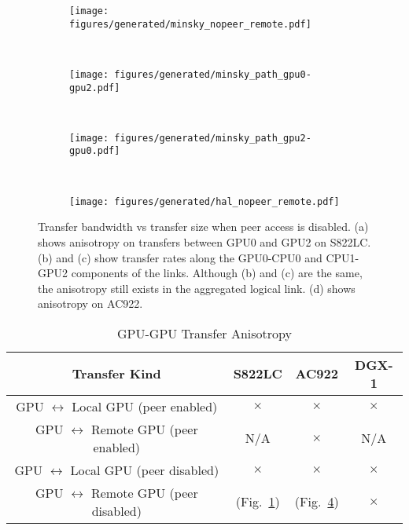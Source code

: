 \begin{figure}[ht]
	\centering
	\begin{subfigure}[b]{0.3\textwidth}
		\texttt{[image: figures/generated/minsky\_nopeer\_remote.pdf]}
		\caption{}
		\label{fig:minsky-explicit-nopeer-remote}
	\end{subfigure}
	~
	\begin{subfigure}[b]{0.3\textwidth}
		\texttt{[image: figures/generated/minsky\_path\_gpu0-gpu2.pdf]}
		\caption{}
		\label{fig:minsky-explicit-path-gpu0-gpu2}
	\end{subfigure}
	~
	\begin{subfigure}[b]{0.3\textwidth}
		\texttt{[image: figures/generated/minsky\_path\_gpu2-gpu0.pdf]}
		\caption{}
		\label{fig:minsky-explicit-path-gpu2-gpu0}
	\end{subfigure}
	\\
	\begin{subfigure}[b]{0.3\textwidth}
		\texttt{[image: figures/generated/hal\_nopeer\_remote.pdf]}
		\caption{}
		\label{fig:explicit-ac922-nopeer-remote}
	\end{subfigure}
	\caption[]{
		Transfer bandwidth vs transfer size when peer access is disabled.
		(a) shows anisotropy on transfers between GPU0 and GPU2 on S822LC.
		(b) and (c) show transfer rates along the GPU0-CPU0 and CPU1-GPU2 components of the links.
		Although (b) and (c) are the same, the anisotropy still exists in the aggregated logical link.
		(d) shows anisotropy on AC922.
	}
	\label{fig:explicit-peer-anisotropy}
\end{figure}

\begin{table}[ht]
	\centering
	\caption[GPU-GPU Transfer Anisotropy]{GPU-GPU Transfer Anisotropy}
	\label{tab:explicit-peer-direction}
	\begin{tabular}{|c|c|c|c|}
		\hline
		\textbf{Transfer Kind}                           & \textbf{S822LC}                                           & \textbf{AC922}                                           & \textbf{DGX-1} \\ \hline 
		GPU $\leftrightarrow$ Local GPU  (peer enabled)  & $\times$                                                  & $\times$                                                 & $\times$       \\ \hline
		GPU $\leftrightarrow$ Remote GPU (peer enabled)  & N/A                                                       & $\times$                                                 & N/A            \\ \hline
		GPU $\leftrightarrow$ Local GPU  (peer disabled) & $\times$                                                  & $\times$                                                 & $\times$       \\ \hline
		GPU $\leftrightarrow$ Remote GPU (peer disabled) & \checkmark (Fig.~\ref{fig:minsky-explicit-nopeer-remote}) & \checkmark (Fig.~\ref{fig:explicit-ac922-nopeer-remote}) & $\times$       \\ \hline
	\end{tabular}
\end{table}

